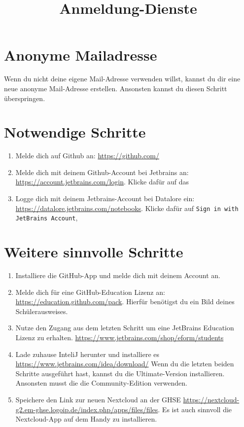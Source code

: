 \documentclass[]{scrartcl}
\title{Anmeldung-Dienste}
\begin{document}
\section{Anonyme Mailadresse}
Wenn du nicht deine eigene Mail-Adresse verwenden willst, kannst du dir eine neue anonyme Mail-Adresse erstellen. Ansonsten kannst du diesen Schritt überspringen. 
\section{Notwendige Schritte}
\begin{enumerate}
\item Melde dich auf Github an: \url{https://github.com/}

\item Melde dich mit deinem Github-Account bei Jetbrains an:
 \url{https://account.jetbrains.com/login}. Klicke dafür auf das 

\item Logge dich mit deinem Jetbrains-Account bei Datalore ein: \url{https://datalore.jetbrains.com/notebooks}. Klicke dafür auf \texttt{Sign in with JetBrains Account},
\end{enumerate}
\section{Weitere sinnvolle Schritte}
\begin{enumerate}


\item Installiere die GitHub-App und melde dich mit deinem Account an.

\item Melde dich für eine GitHub-Education Lizenz an:
\url{https://education.github.com/pack}. Hierfür benötigst du ein Bild deines Schülerausweises.

\item Nutze den Zugang aus dem letzten Schritt um eine JetBrains Education Lizenz zu erhalten. \url{https://www.jetbrains.com/shop/eform/students}

\item Lade zuhause InteliJ herunter und installiere es \url{https://www.jetbrains.com/idea/download/} Wenn du die letzten beiden Schritte ausgeführt hast, kannst du die Ultimate-Version installieren. Ansonsten musst die die Community-Edition verwenden.

\item Speichere den Link zur neuen Nextcloud an der GHSE \url{https://nextcloud-g2.em-ghse.logoip.de/index.php/apps/files/files}. Es ist auch sinnvoll die Nextcloud-App auf dem Handy zu installieren.


\end{enumerate}
\end{document}
